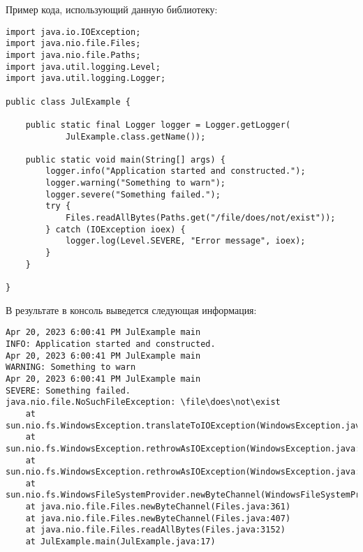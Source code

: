 Пример кода, использующий данную библиотеку:

\begin{lstlisting}
import java.io.IOException;
import java.nio.file.Files;
import java.nio.file.Paths;
import java.util.logging.Level;
import java.util.logging.Logger;
 
public class JulExample {
 
    public static final Logger logger = Logger.getLogger(
            JulExample.class.getName());
    
    public static void main(String[] args) {
        logger.info("Application started and constructed.");
        logger.warning("Something to warn");
        logger.severe("Something failed.");
        try {
            Files.readAllBytes(Paths.get("/file/does/not/exist"));
        } catch (IOException ioex) {
            logger.log(Level.SEVERE, "Error message", ioex);
        }
    }
 
}
\end{lstlisting}

В результате в консоль выведется следующая информация:

\begin{lstlisting}
Apr 20, 2023 6:00:41 PM JulExample main
INFO: Application started and constructed.
Apr 20, 2023 6:00:41 PM JulExample main
WARNING: Something to warn
Apr 20, 2023 6:00:41 PM JulExample main
SEVERE: Something failed.
java.nio.file.NoSuchFileException: \file\does\not\exist
	at sun.nio.fs.WindowsException.translateToIOException(WindowsException.java:79)
	at sun.nio.fs.WindowsException.rethrowAsIOException(WindowsException.java:97)
	at sun.nio.fs.WindowsException.rethrowAsIOException(WindowsException.java:102)
	at sun.nio.fs.WindowsFileSystemProvider.newByteChannel(WindowsFileSystemProvider.java:230)
	at java.nio.file.Files.newByteChannel(Files.java:361)
	at java.nio.file.Files.newByteChannel(Files.java:407)
	at java.nio.file.Files.readAllBytes(Files.java:3152)
	at JulExample.main(JulExample.java:17)
\end{lstlisting}

\label{pages_total}

